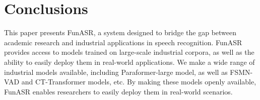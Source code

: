 \documentclass{INTERSPEECH2023}
\begin{document}
\section{Conclusions}


This paper presents FunASR, a system designed to bridge the gap between academic research and industrial applications in speech recognition. FunASR provides access to models trained on large-scale industrial corpora, as well as the ability to easily deploy them in real-world applications. We make a wide range of industrial models available, including  Paraformer-large model, as well as FSMN-VAD and CT-Transformer models, etc.
By making these models openly available, FunASR enables researchers to easily deploy them in real-world scenarios.


\vfill\pagebreak




\end{document}
